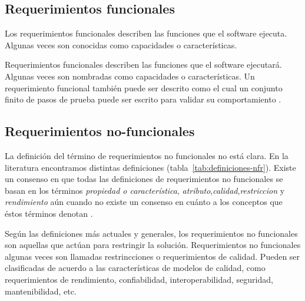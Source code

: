 \subsection{Requerimientos funcionales}

Los requerimientos funcionales describen las funciones que el software ejecuta. 
Algunas veces son conocidas como capacidades o características.

Requerimientos funcionales describen las funciones que el software ejecutará. Algunas 
veces son nombradas como capacidades o características. Un requerimiento funcional
también puede ser descrito como el cual un conjunto finito de pasos de prueba puede
ser escrito para validar su comportamiento \cite{IEEEComputerSociety2013}.

\subsection{Requerimientos no-funcionales}

La definición del término de requerimientos no funcionales
no está clara. En la literatura encontramos distintas definiciones
(tabla~\ref{tab:definiciones-nfr}). Existe un consenso en que todas 
las definiciones de requerimientos no funcionales se basan en 
los términos \textit{propiedad o característica},
\textit{atributo},\textit{calidad},\textit{restriccion} y \textit{rendimiento} 
aún cuando no existe un consenso en cuánto a los conceptos 
que éstos términos denotan \cite{Glinz2007}.

Según las definiciones más actuales y generales, los requerimientos no funcionales
son aquellas que actúan para restringir la solución. Requerimientos no funcionales
algunas veces son llamadas restrincciones o requerimientos de calidad. Pueden ser
clasificadas de acuerdo a las características de modelos de calidad, como requerimientos
de rendimiento, confiabilidad, interoperabilidad, seguridad, mantenibilidad, etc. \cite{IEEEComputerSociety2013}

